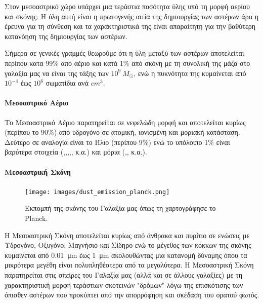 \documentclass[a4paper,12pt]{memoir}
\begin{document}
Στον μεσοαστρικό χώρο υπάρχει μια τεράστια ποσότητα ύλης υπό τη μορφή αερίου και σκόνης. Η ύλη αυτή είναι η πρωτογενής αιτία της δημιουργίας των αστέρων άρα η έρευνα για τη σύνθεση και τα χαρακτηριστικά της είναι απαραίτητη για την βαθύτερη κατανόηση της δημιουργίας των αστέρων.

Σήμερα σε γενικές γραμμές θεωρούμε ότι η ύλη μεταξύ των αστέρων αποτελείται περίπου κατα 99\% από αέριο και κατά 1\% από σκόνη με τη συνολική της μάζα στο γαλαξία μας να είναι της τάξης των $10^9\ M_{\odot}$, ενώ η πυκνότητα της κυμαίνεται από $10^{-4}$ έως $10^{6}$ σωματίδια ανά $cm^3$.

\paragraph{Μεσοαστρικό Αέριο} 
Το Μεσοαστρικό Αέριο παρατηρείται σε νεφελώδη μορφή και αποτελείται κυρίως (περίπου το 90\%) από υδρογόνο σε ατομική, ιονισμένη και μοριακή κατάσταση. Δεύτερο σε αναλογία είναι το Ήλιο (περίπου 9\%) ενώ το υπόλοιπο 1\% είναι βαρύτερα στοιχεία (,,,,, κ.α.) και μόρια (,, κ.α.).

\paragraph{Μεσοαστρική Σκόνη}
\begin{figure}[h]
	\centering
	\texttt{[image: images/dust\_emission\_planck.png]}
	\caption{Εκπομπή της σκόνης του Γαλαξία μας όπως τη χαρτογράφησε το Planck.\cite{planck_2014}}
\end{figure}

Η Μεσοαστρική Σκόνη αποτελείται κυρίως από άνθρακα και πυρίτιο σε ενώσεις με Υδρογόνο, Οξυγόνο, Μαγνήσιο και Σίδηρο ενώ το μέγεθος των κόκκων της σκόνης κυμαίνεται από \SI{0.01}{\micro\meter} έως \SI{1}{\micro\meter} ακολουθώντας μια κατανομή δύναμης όπου τα μικρότερα μεγέθη είναι πολυπληθέστερα από τα μεγαλύτερα. 
Η Μεσοαστρική Σκόνη παρατηρείται στις σπείρες του Γαλαξία μας (αλλά και σε άλλους γαλαξίες) με τη χαρακτηριστική μορφή τεράστιων σκοτεινών "δρόμων" λόγω της επισκότισης των όπισθεν αστέρων που προκύπτει από την απορρόφηση και σκέδαση του ορατού φωτός.
\end{document}
